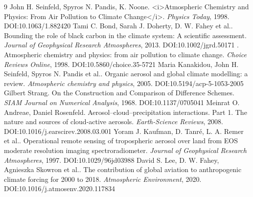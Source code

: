 \documentclass[11pt]{article}
\begin{document}
\begin{thebibliography}{9}
 John H. Seinfeld, Spyros Ν. Pandis, K. Noone. <i>Atmospheric Chemistry and Physics: From Air Pollution to Climate Change</i>. \emph{Physics Today}, 1998. DOI:10.1063/1.882420
 Tami C. Bond, Sarah J. Doherty, D. W. Fahey et al.. Bounding the role of black carbon in the climate system: A scientific assessment. \emph{Journal of Geophysical Research Atmospheres}, 2013. DOI:10.1002/jgrd.50171
 . Atmospheric chemistry and physics: from air pollution to climate change. \emph{Choice Reviews Online}, 1998. DOI:10.5860/choice.35-5721
 Maria Kanakidou, John H. Seinfeld, Spyros Ν. Pandis et al.. Organic aerosol and global climate modelling: a review. \emph{Atmospheric chemistry and physics}, 2005. DOI:10.5194/acp-5-1053-2005
 Gilbert Strang. On the Construction and Comparison of Difference Schemes. \emph{SIAM Journal on Numerical Analysis}, 1968. DOI:10.1137/0705041
 Meinrat O. Andreae, Daniel Rosenfeld. Aerosol–cloud–precipitation interactions. Part 1. The nature and sources of cloud-active aerosols. \emph{Earth-Science Reviews}, 2008. DOI:10.1016/j.earscirev.2008.03.001
 Yoram J. Kaufman, D. Tanré, L. A. Remer et al.. Operational remote sensing of tropospheric aerosol over land from EOS moderate resolution imaging spectroradiometer. \emph{Journal of Geophysical Research Atmospheres}, 1997. DOI:10.1029/96jd03988
 David S. Lee, D. W. Fahey, Agnieszka Skowron et al.. The contribution of global aviation to anthropogenic climate forcing for 2000 to 2018. \emph{Atmospheric Environment}, 2020. DOI:10.1016/j.atmosenv.2020.117834
\end{thebibliography}
\end{document}
